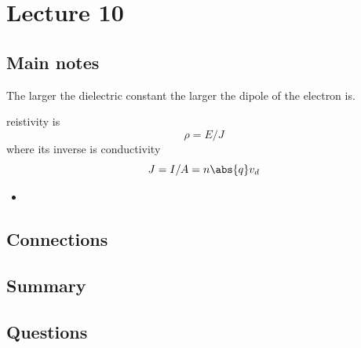 \section{Lecture 10}

\subsection{Main notes}
The larger the dielectric constant the larger the dipole of the electron is.

reistivity is
\[
\rho = E/J
  \]
  where its inverse is conductivity
\[
J = I/A = n \abs{q} v_d
  \]
\begin{itemize}
	\item
\end{itemize}


\subsection{Connections}


\subsection{Summary}


\subsection{Questions}
